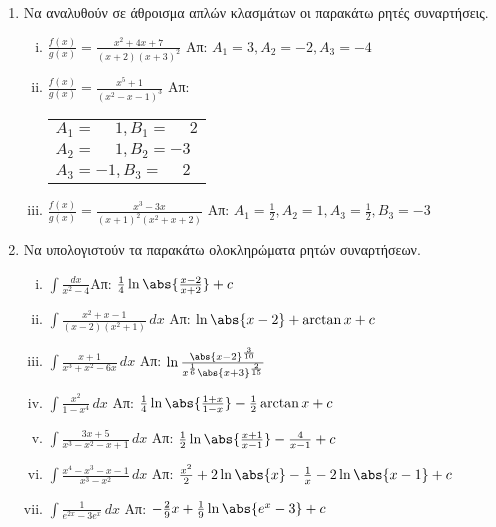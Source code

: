 


\pagestyle{askhseis}
\everymath{\displaystyle}






\begin{center}
  \minibox{\bfseries\large \textcolor{Col1}{Ασκήσεις στα Αόριστα Ολοκληρώματα}}
\end{center}

\vspace{\baselineskip}

\begin{enumerate}
  \item \label{ask:anal} Να αναλυθούν σε άθροισμα απλών κλασμάτων οι παρακάτω ρητές 
    συναρτήσεις.
    \begin{enumerate}[i)]
      \item $\frac{f(x)}{g(x)}=\frac{x^2+4x+7}{(x+2)(x+3)^2}$ 
        \hfill Απ: $A_1=3, A_2=-2, A_3=-4$
      \item $\frac{f(x)}{g(x)}=\frac{x^5+1}{(x^2-x-1)^3}$ 
        \hfill Απ: \begin{tabular}{l} $A_1=\phantom{-}1, B_1=\phantom{-}2$ \\ 
          $A_2=\phantom{-}1, B_2=-3$ \\ $A_3=-1, B_3=\phantom{-}2$
        \end{tabular}
      \item $\frac{f(x)}{g(x)}=\frac{x^3-3x}{(x+1)^2(x^2+x+2)}$ 
        \hfill Απ: $A_1=\frac{1}{2}, A_2=1, A_3=\frac{1}{2}, B_3=-3$
    \end{enumerate}

  \item \label{ask:rhtes} Να υπολογιστούν τα παρακάτω ολοκληρώματα ρητών συναρτήσεων.
    \begin{enumerate}[i)]
      \item $\int\frac{dx}{x^2-4}$\hfill Απ: $\frac{1}{4}\ln\abs{\frac{x-2}{x+2}}+c$
      \item $\int\frac{x^2+x-1}{(x-2)(x^2+1)}\,dx$ \hfill Απ: $\ln\abs{x-2}+\arctan x+c$
      \item $\int\frac{x+1}{x^3+x^2-6x}\,dx$ 
        \hfill Απ: $\ln\frac{\abs{x-2}^{\frac{3}{10}}}{x^{\frac{1}{6}}\abs{x+3}^
        {\frac{2}{15}}}$
      \item $\int\frac{x^2}{1-x^4}\,dx$ 
        \hfill Απ: $\frac{1}{4}\ln\abs{\frac{1+x}{1-x}}-\frac{1}{2}\arctan x+c$
      \item $\int\frac{3x+5}{x^3-x^2-x+1}\, dx$ 
        \hfill Απ: $\frac{1}{2}\ln\abs{\frac{x+1}{x-1}}-\frac{4}{x-1}+c$ 
      \item $\int\frac{x^4-x^3-x-1}{x^3-x^2}\,dx$ 
        \hfill Απ: $\frac{x^2}{2}+2\ln\abs{x}-\frac{1}{x}-2\ln\abs{x-1}+c$
      \item \label{ex:seven} $\int\frac{1}{e^{2x}-3e^{x}}\,dx$ 
        \hfill Απ: $-\frac{2}{9}x+\frac{1}{9}\ln\abs{e^x-3}+c$
    \end{enumerate}


\end{enumerate}
